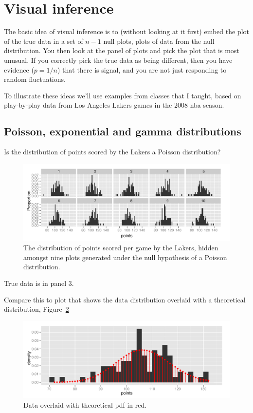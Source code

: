 \documentclass[oneside]{article}
\begin{document}
\section{Visual inference}
\label{sec:visual_inference}

The basic idea of visual inference is to (without looking at it first) embed the plot of the true data in a set of $n - 1$ null plots, plots of data from the null distribution. You then look at the panel of plots and pick the plot that is most unusual. If you correctly pick the true data as being different, then you have evidence ($p = 1/n$) that there is signal, and you are not just responding to random fluctuations.

To illustrate these ideas we'll use examples from classes that I taught, based on play-by-play data from Los Angeles Lakers games in the 2008 {\sc nba} season.

\subsection{Poisson, exponential and gamma distributions}
\label{sub:univariate}

Is the distribution of points scored by the Lakers a Poisson distribution?

\begin{figure}[htbp]
  \centering
    \includegraphics[width=\linewidth]{poisson}
  \caption{The distribution of points scored per game by the Lakers, hidden amongst nine plots generated under the null hypothesis of a Poisson distribution.}
  \label{fig:poisson}
\end{figure}

True data is in panel 3.

Compare this to plot that shows the data distribution overlaid with a theoretical distribution, Figure~\ref{fig:poisson-overlay}

\begin{figure}[htbp]
  \centering
    \includegraphics[width=0.5\linewidth]{poisson-overlay}
  \caption{Data overlaid with theoretical pdf in red.}
  \label{fig:poisson-overlay}
\end{figure}
\end{document}
